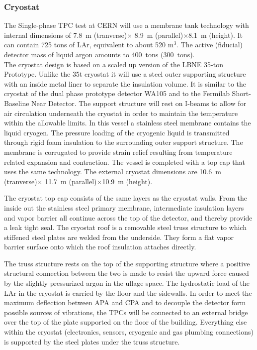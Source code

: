 \subsubsection{Cryostat}

The Single-phase TPC test at CERN will use a membrane tank technology with internal dimensions of 
7.8~m (tranverse)$\times$ 8.9~m (parallel)$\times$8.1~m (height). 
It can contain  725 tons of LAr, equivalent to about 520 m$^3$. The active (fiducial) detector mass of liquid argon amounts to 400~tons (300~tons).\\
The cryostat design is based on a scaled up version of the LBNE 35-ton Prototype\cite{montanari_35ton}. 
Unlike the 35t cryostat it will use a steel outer supporting structure with an inside metal liner to separate the insulation volume. It is similar to the cryostat of the dual phase prototype detector WA105 and to the Fermilab Short-Baseline Near Detector. The support structure will rest on I-beams to allow for air circulation underneath the cryostat in order to maintain the temperature within the allowable limits.
In this vessel a stainless steel membrane contains the liquid cryogen. The pressure loading of the cryogenic liquid is transmitted through rigid foam insulation to the surrounding outer support structure. The membrane is corrugated to provide strain relief resulting from temperature related expansion and contraction. The vessel is completed with a top cap that uses the same technology.
The external cryostat dimensions are 10.6~m (tranverse)$\times$ 11.7~m (parallel)$\times$10.9~m (height). 


The cryostat top cap consists of the same layers as the cryostat walls. From the inside out
the stainless steel primary membrane, intermediate insulation layers and vapor barrier all continue across 
the top of the detector, and thereby provide a leak tight seal. 
The cryostat roof is a removable steel truss structure 
to which stiffened steel plates are welded from the 
underside. They form a flat vapor barrier surface onto which the roof insulation attaches directly. 

The truss structure rests on the top of the supporting structure where a positive structural connection 
between the two is made to resist the upward force caused by the slightly pressurized argon in the ullage 
space. The hydrostatic load of the LAr in the cryostat is carried by the floor and the sidewalls. In order to meet the maximum deflection between APA and CPA and to decouple the detector form possible sources of vibrations, the TPCs will be connected to an external bridge over the top of the plate supported on the floor of the building. Everything else within the cryostat 
(electronics, sensors, cryogenic and gas plumbing connections) is 
supported by the steel plates under the truss structure. 

